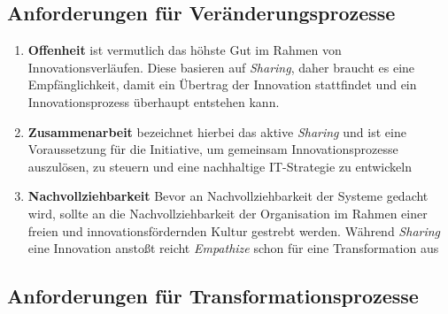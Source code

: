 \subsection{Anforderungen für Veränderungsprozesse}
\begin{enumerate}
    \item \textbf{Offenheit} \cite{Brockhoff2006} ist vermutlich das höhste Gut im Rahmen von Innovationsverläufen. Diese basieren auf \emph{Sharing}, daher braucht es eine Empfänglichkeit, damit ein Übertrag der Innovation stattfindet und ein Innovationsprozess überhaupt entstehen kann.
    
    \item \textbf{Zusammenarbeit} bezeichnet hierbei das aktive \emph{Sharing} und ist eine Voraussetzung für die Initiative, um gemeinsam Innovationsprozesse auszulösen, zu steuern und eine nachhaltige IT-Strategie zu entwickeln
    
    \item \textbf{Nachvollziehbarkeit} Bevor an Nachvollziehbarkeit der Systeme gedacht wird, sollte an die Nachvollziehbarkeit der Organisation im Rahmen einer freien und innovationsfördernden Kultur gestrebt werden. Während \emph{Sharing} eine Innovation anstoßt reicht \emph{Empathize} schon für eine Transformation aus
    

\end{enumerate}

\subsection{Anforderungen für Transformationsprozesse}

